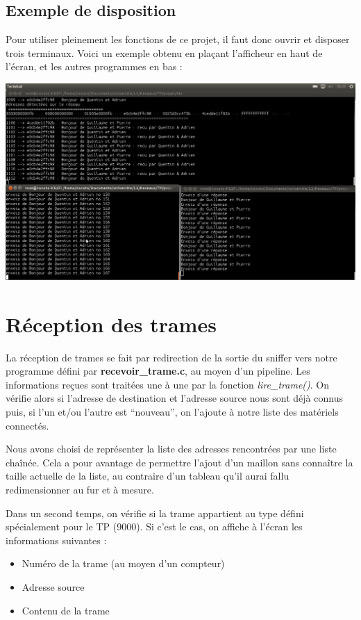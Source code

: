 \documentclass[a4paper,11pt]{article}
\begin{document}
		\subsection{Exemple de disposition}
		Pour utiliser pleinement les fonctions de ce projet, il faut donc ouvrir et disposer trois terminaux. Voici un exemple obtenu en plaçant l'afficheur en haut de l'écran, et les autres programmes en bas :\\
		\begin{center} \includegraphics[width=15cm]{capture_ecran_rapport.png}\label{presentation}\end{center}
	\section{Réception des trames}
	La réception de trames se fait par redirection de la sortie du sniffer vers notre programme défini par \textbf{recevoir\_trame.c}, au moyen d'un pipeline.
	Les informations reçues sont traitées une à une par la fonction \textit{lire\_trame()}. On vérifie alors si l'adresse de destination et l'adresse source nous sont déjà connus puis, si l'un et/ou l'autre est ``nouveau'', on l'ajoute à notre liste des matériels connectés.

	Nous avons choisi de représenter la liste des adresses rencontrées par une liste chaînée. Cela a pour avantage de permettre l'ajout d'un maillon sans connaître la taille actuelle de la liste, au contraire d'un tableau qu'il aurai fallu redimensionner au fur et à mesure.
	
	Dans un second temps, on vérifie si la trame appartient au type défini spécialement pour le TP (9000). Si c'est le cas, on affiche à l'écran les informations suivantes :
	\begin{itemize}
		\item Numéro de la trame (au moyen d'un compteur)
		\item Adresse source
		\item Contenu de la trame
	\end{itemize}
\end{document}
